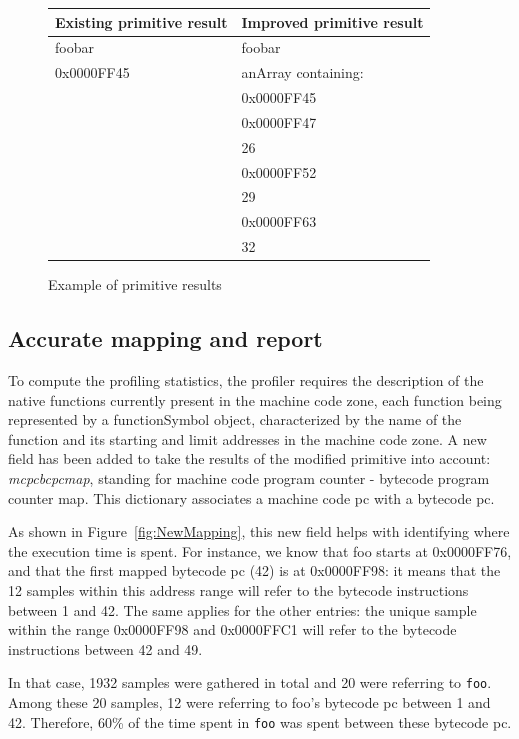 \documentclass[10pt,preprint,nonatbib]{sigplanconf}
\newcommand{\ct}{\lstinline[backgroundcolor=\color{white},basicstyle=\small\ttfamily]}
\newcommand{\figref}[1]{Figure~\ref{fig:#1}}
\begin{document}
\begin{figure}
    \begin{center}
		\noindent  \begin{tabular}{l | l}
		Existing primitive result & Improved primitive result \\		
		\midrule
		foobar & foobar \\
		0x0000FF45 & anArray containing: \\
		& 0x0000FF45 \\
		& 0x0000FF47 \\
		& 26 \\
		& 0x0000FF52 \\
		& 29 \\
		& 0x0000FF63 \\
		& 32 \\
		\end{tabular}
	\caption{Example of primitive results\label{fig:Primitive}}
    \end{center}
\end{figure}

\subsection{Accurate mapping and report}

To compute the profiling statistics, the profiler requires the description of the native functions currently present in the machine code zone, each function being represented by a functionSymbol object, characterized by the name of the function and its starting and limit addresses in the machine code zone.
A new field has been added to take the results of the modified primitive into account: \textit{mcpcbcpcmap}, standing for machine code program counter - bytecode program counter map. This dictionary associates a machine code pc with a bytecode pc.

As shown in \figref{NewMapping}, this new field helps with identifying where the execution time is spent. For instance, we know that foo starts at 0x0000FF76, and that the first mapped bytecode pc (42) is at 0x0000FF98: it means that the 12 samples within this address range will refer to the bytecode instructions between 1 and 42.
The same applies for the other entries: the unique sample within the range 0x0000FF98 and 0x0000FFC1 will refer to the bytecode instructions between 42 and 49. 

In that case, 1932 samples were gathered in total and 20 were referring to \ct{foo}. Among these 20 samples, 12 were referring to foo's bytecode pc between 1 and 42. Therefore, 60\% of the time spent in \ct{foo} was spent between these bytecode pc.
\end{document}
